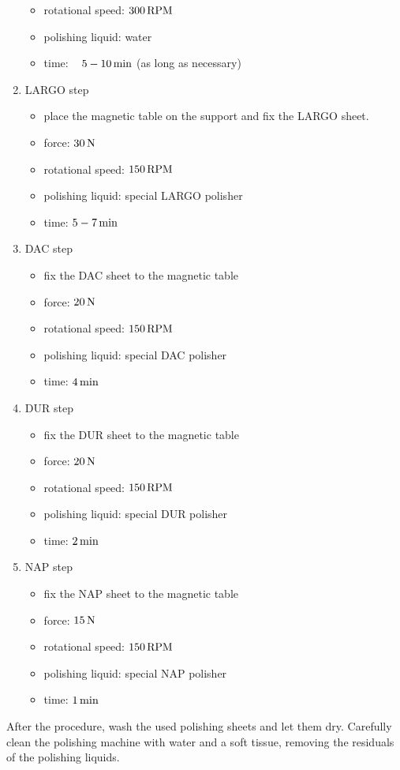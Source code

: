 \begin{appendices}
\begin{enumerate}
\begin{itemize}
\item rotational speed: $300\,\rm{RPM}$
\item polishing liquid: water
\item time: ~ $5-10\,\rm{min}$ (as long as necessary)
\end{itemize}
\item LARGO step
\begin{itemize}
\item place the magnetic table on the support and fix the LARGO sheet.
\item force: $30\,\rm{N}$ 
\item rotational speed: $150\,\rm{RPM}$
\item polishing liquid: special LARGO polisher
\item time: $5-7\,\rm{min}$
\end{itemize}
\item DAC step
\begin{itemize}
\item fix the DAC sheet to the magnetic table
\item force: $20\,\rm{N}$  
\item rotational speed: $150\,\rm{RPM}$
\item polishing liquid: special DAC polisher
\item time: $4\,\rm{min}$
\end{itemize} 
\item DUR step

\begin{itemize}
\item fix the DUR sheet to the magnetic table
\item force: $20\,\rm{N}$ 
\item rotational speed: $150\,\rm{RPM}$
\item polishing liquid: special DUR polisher
\item time: $2\,\rm{min}$
\end{itemize}
\item NAP step
\begin{itemize}
\item fix the NAP sheet to the magnetic table
\item force: $15\,\rm{N}$  
\item rotational speed: $150\,\rm{RPM}$
\item polishing liquid: special NAP polisher 
\item time: $1\,\rm{min}$
\end{itemize}
\end{enumerate}
After the procedure, wash the used polishing sheets and let them dry. Carefully clean the polishing machine with water and a soft tissue, removing the residuals of the polishing liquids.


\end{appendices}
